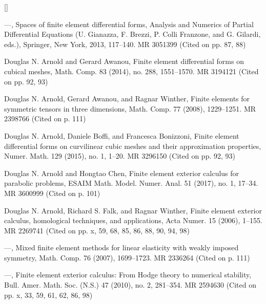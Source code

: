 \begin{list}{[]}{\setlength{\leftmargin}{2.7em}\setlength{\labelwidth}{2.2em}}
\item\label{bib:source-6}—, Spaces of finite element differential forms, Analysis and Numerics of Partial Differential Equations (U. Gianazza, F. Brezzi, P. Colli Franzone, and G. Gilardi, eds.), Springer, New York, 2013, 117–140. MR 3051399 (Cited on pp. 87, 88)

\item\label{bib:source-7}Douglas N. Arnold and Gerard Awanou, Finite element differential forms on cubical meshes, Math. Comp. 83 (2014), no. 288, 1551–1570. MR 3194121 (Cited on pp. 92, 93)

\item\label{bib:source-8}Douglas N. Arnold, Gerard Awanou, and Ragnar Winther, Finite elements for symmetric tensors in three dimensions, Math. Comp. 77 (2008), 1229–1251. MR 2398766 (Cited on p. 111)

\item\label{bib:source-9}Douglas N. Arnold, Daniele Boffi, and Francesca Bonizzoni, Finite element differential forms on curvilinear cubic meshes and their approximation properties, Numer. Math. 129 (2015), no. 1, 1–20. MR 3296150 (Cited on pp. 92, 93)

\item\label{bib:source-10}Douglas N. Arnold and Hongtao Chen, Finite element exterior calculus for parabolic problems, ESAIM Math. Model. Numer. Anal. 51 (2017), no. 1, 17–34. MR 3600999 (Cited on p. 101)

\item\label{bib:source-11}Douglas N. Arnold, Richard S. Falk, and Ragnar Winther, Finite element exterior calculus, homological techniques, and applications, Acta Numer. 15 (2006), 1–155. MR 2269741 (Cited on pp. x, 59, 68, 85, 86, 88, 90, 94, 98)

\item\label{bib:source-12}—, Mixed finite element methods for linear elasticity with weakly imposed symmetry, Math. Comp. 76 (2007), 1699–1723. MR 2336264 (Cited on p. 111)

\item\label{bib:source-13}—, Finite element exterior calculus: From Hodge theory to numerical stability, Bull. Amer. Math. Soc. (N.S.) 47 (2010), no. 2, 281–354. MR 2594630 (Cited on pp. x, 33, 59, 61, 62, 86, 98)


\end{list}

